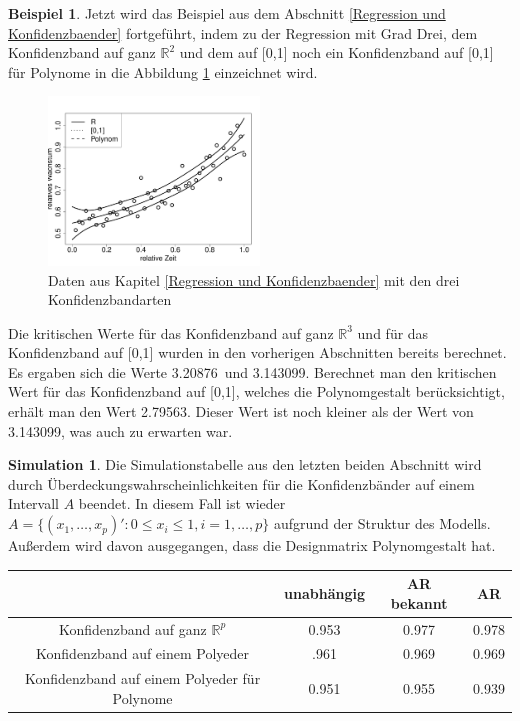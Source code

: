 \documentclass[12pt,a4paper]{article}
\theoremstyle{definition}
\newtheorem{Beispiel}[Definition]{Beispiel}
\theoremstyle{definition}
\theoremstyle{definition}
\newtheorem{Simulation}[Definition]{Simulation}
\theoremstyle{definition}
\newcommand{\cR}{3.20876}
\newcommand{\cA}{3.143099}
\newcommand{\cAP}{2.79563}
\newcommand{\UeberRR}{0.953}
\newcommand{\UeberRMinmax}{.961}
\newcommand{\UeberRMinmaxPolyfast}{0.951}
\newcommand{\UeberARbekanntR}{0.977}
\newcommand{\UeberARbekanntMinmax}{0.969}
\newcommand{\UeberARbekanntMinmaxPolyfast}{0.955}
\newcommand{\UeberARR}{0.978}
\newcommand{\UeberARMinmax}{0.969}
\newcommand{\UeberARMinmaxPolyfast}{0.939}
\begin{document}
\begin{Beispiel}
Jetzt wird das Beispiel aus dem Abschnitt \ref{Regression und Konfidenzbaender} fortgeführt, indem zu der Regression mit Grad Drei, dem Konfidenzband auf ganz $\mathbb{R}^2$ und dem auf [0,1] noch ein Konfidenzband auf [0,1] für Polynome in die Abbildung \ref{KB-poly-BSP} einzeichnet wird.

\begin{figure}[H] 
  \centering
     \includegraphics[width=0.5\textwidth]{Bsp-KB-poly}
  \caption{Daten aus Kapitel \ref{Regression und Konfidenzbaender} mit den drei Konfidenzbandarten}
  \label{KB-poly-BSP}
\end{figure}

Die kritischen Werte für das Konfidenzband auf ganz $\mathbb{R}^{3}$ und für das Konfidenzband auf [0,1] wurden in den vorherigen Abschnitten bereits berechnet. Es ergaben sich die Werte \cR ~und \cA . Berechnet man den kritischen Wert für das Konfidenzband auf [0,1], welches die Polynomgestalt berücksichtigt, erhält man den Wert \cAP . Dieser Wert ist noch kleiner als der Wert von \cA , was auch zu erwarten war.
\end{Beispiel}

\begin{Simulation}
Die Simulationstabelle aus den letzten beiden Abschnitt wird durch Überdeckungswahrscheinlichkeiten für die Konfidenzbänder auf einem Intervall $A$ beendet. In diesem Fall ist wieder $A = \{ (x_1, \ldots, x_p)' : 0 \leq x_i \leq 1, i=1, \ldots, p \}$ aufgrund der Struktur des Modells. Außerdem wird davon ausgegangen, dass die Designmatrix Polynomgestalt hat.

\begin{center}
\begin{tabular}{|c|c|c|c|}
\hline 
& unabhängig & AR bekannt & AR \\ 
\hline 
Konfidenzband auf ganz $\mathbb{R}^{p}$		 & \UeberRR		  & \UeberARbekanntR & \UeberARR \\ 
\hline 
Konfidenzband auf einem Polyeder	 & \UeberRMinmax  & \UeberARbekanntMinmax & \UeberARMinmax \\ 
\hline 
Konfidenzband auf einem Polyeder für Polynome  & \UeberRMinmaxPolyfast & \UeberARbekanntMinmaxPolyfast & \UeberARMinmaxPolyfast \\ 
\hline 
\end{tabular} 
\end{center}

\end{Simulation}
\end{document}

